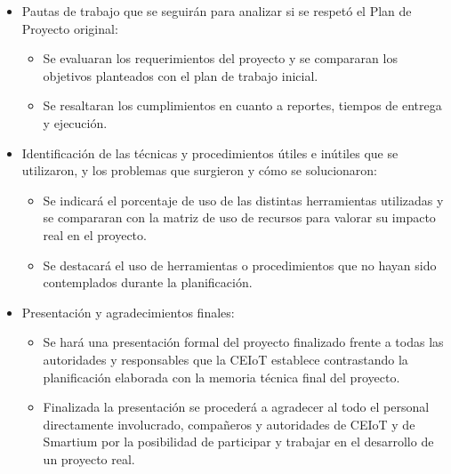 \documentclass[11pt]{charter}
\begin{document}
\begin{itemize}
\item Pautas de trabajo que se seguirán para analizar si se respetó el Plan de Proyecto original:
	\begin{itemize}
	\item Se evaluaran los requerimientos del proyecto y se compararan los objetivos planteados con el plan de trabajo inicial. 
	\item Se resaltaran los cumplimientos en cuanto a reportes, tiempos de entrega y ejecución. 
	\end{itemize}

\item Identificación de las técnicas y procedimientos útiles e inútiles que se utilizaron, y los problemas que surgieron y cómo se solucionaron:
	\begin{itemize}
	\item Se indicará el porcentaje de uso de las distintas herramientas utilizadas y se compararan con la matriz de uso de recursos para valorar su impacto real en el proyecto. 
	\item Se destacará el uso de herramientas o procedimientos que no hayan sido contemplados durante la planificación. 
	\end{itemize}

\item Presentación y agradecimientos finales:
	\begin{itemize}
	\item Se hará una presentación formal del proyecto finalizado frente a todas las autoridades y responsables que la CEIoT establece contrastando la planificación elaborada con la memoria técnica final del proyecto. 
	\item Finalizada la presentación se procederá a agradecer al todo el personal directamente involucrado, compañeros y autoridades de CEIoT y de Smartium por la posibilidad de participar y trabajar en el desarrollo de un proyecto real. 
	
	\end{itemize}
\end{itemize}
\end{document}
